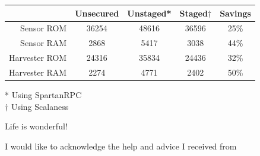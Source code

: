 
\begin{center}
\begin{tabular}{|r||c|c|c|c|} \hline
              & Unsecured & Unstaged* & Staged$\dagger$ & Savings\\ \hline
Sensor ROM    &     36254 &    48616 &  36596 & 25\% \\
Sensor RAM    &      2868 &     5417 &   3038 & 44\% \\ \hline
Harvester ROM &     24316 &    35834 &  24436 & 32\% \\
Harvester RAM &      2274 &     4771 &   2402 & 50\% \\ \hline
\end{tabular}
\end{center}
\vspace{0.5in}
* Using SpartanRPC\\
$\dagger$ Using Scalaness
\stopslide


Life is wonderful!
\stopslide



\centerline{I would like to acknowledge the help and advice I received from}
\centerline{}
\stopslide


\makeatletter
{}
\makeatother
\stopslide
